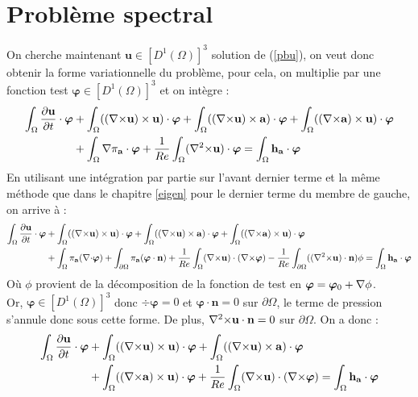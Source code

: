 \section{Problème spectral}
\label{spectre}
On cherche maintenant $\mathbf{u}\in [D^1(\Omega)]^3$ solution de (\ref{pbu}), on veut donc obtenir la forme variationnelle du problème, pour cela, on multiplie par une fonction test $\bm{\varphi}\in [D^1(\Omega)]^3$ et on intègre :
\begin{align*}
\int_\Omega \frac{\partial \mathbf{u}}{\partial t}\cdot \bm{\varphi} &+ \int_\Omega (({\nabla\times} \mathbf{u})\times \mathbf{u})\cdot \bm{\varphi} + \int_\Omega (({\nabla\times} \mathbf{u})\times \mathbf{a})\cdot\bm{\varphi} + \int_\Omega (({\nabla\times} \mathbf{a})\times \mathbf{u})\cdot\bm{\varphi} \\
&+ \int_\Omega {\nabla}\pi_{\mathbf{a}}\cdot\bm{\varphi} + \frac{1}{Re}\int_\Omega ({\nabla^2\times} \mathbf{u})\cdot\bm{\varphi} = \int_\Omega \mathbf{h_a}\cdot\bm{\varphi}
\end{align*}
En utilisant une intégration par partie sur l'avant dernier terme et la même méthode que dans le chapitre \ref{eigen} pour le dernier terme du membre de gauche, on arrive à :
\begin{align*}
\int_\Omega \frac{\partial \mathbf{u}}{\partial t}\cdot \bm{\varphi} &+ \int_\Omega (({\nabla\times} \mathbf{u})\times \mathbf{u})\cdot \bm{\varphi} + \int_\Omega (({\nabla\times} \mathbf{u})\times \mathbf{a})\cdot\bm{\varphi} + \int_\Omega (({\nabla\times} \mathbf{a})\times \mathbf{u})\cdot\bm{\varphi}\\
&+ \int_\Omega \pi_{\mathbf{a}}({\nabla\cdot}\bm{\varphi}) + \int_{\partial \Omega} \pi_{\mathbf{a}}(\bm{\varphi}\cdot \mathbf{n}) + \frac{1}{Re}\int_\Omega ({\nabla\times} \mathbf{u})\cdot({\nabla\times}\bm{\varphi}) -\frac{1}{Re}\int_{\partial\Omega} (({\nabla^2\times} \mathbf{u})\cdot \mathbf{n})\phi = \int_\Omega \mathbf{h_a}\cdot\bm{\varphi}
\end{align*}
Où $\phi$ provient de la décomposition de la fonction de test en $\bm{\varphi}=\bm{\varphi}_0+{\nabla}\phi$.\\
Or, $\bm{\varphi}\in [D^1(\Omega)]^3$ donc $\div\bm{\varphi}=0$ et $\bm{\varphi}\cdot \mathbf{n}=0$ sur $\partial\Omega$, le terme de pression s'annule donc sous cette forme. De plus, ${\nabla^2\times} \mathbf{u}\cdot \mathbf{n}=0$ sur $\partial\Omega$. On a donc :
\begin{equation}\label{fvu}
\begin{aligned}
\int_\Omega \frac{\partial \mathbf{u}}{\partial t}\cdot \bm{\varphi} &+ \int_\Omega (({\nabla\times} \mathbf{u})\times \mathbf{u})\cdot \bm{\varphi} + \int_\Omega (({\nabla\times} \mathbf{u})\times \mathbf{a})\cdot\bm{\varphi} \\
&+ \int_\Omega (({\nabla\times} \mathbf{a})\times \mathbf{u})\cdot\bm{\varphi} + \frac{1}{Re}\int_\Omega ({\nabla\times} \mathbf{u})\cdot({\nabla\times}\bm{\varphi}) = \int_\Omega \mathbf{h_a}\cdot\bm{\varphi}
\end{aligned}
\end{equation}


